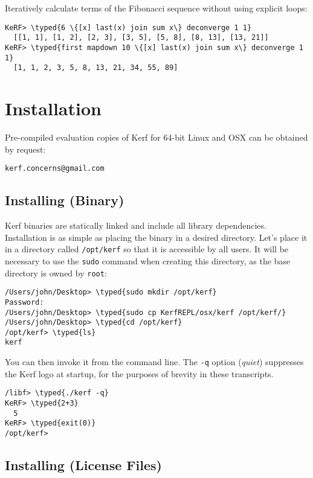 \documentclass{article}
\newcommand{\typed}[1]{\textcolor{TealBlue}{#1}}
\begin{document}
\vspace{0.5cm}

Iteratively calculate terms of the Fibonacci sequence without using explicit loops:
\begin{Verbatim}
KeRF> \typed{6 \{[x] last(x) join sum x\} deconverge 1 1}
  [[1, 1], [1, 2], [2, 3], [3, 5], [5, 8], [8, 13], [13, 21]]
KeRF> \typed{first mapdown 10 \{[x] last(x) join sum x\} deconverge 1 1}
  [1, 1, 2, 3, 5, 8, 13, 21, 34, 55, 89]
\end{Verbatim}

\pagebreak
\section {Installation}
Pre-compiled evaluation copies of Kerf for 64-bit Linux and OSX can be obtained by request:

\begin{center}
	\texttt{kerf.concerns@gmail.com}
\end{center}

\subsection{Installing (Binary)}
Kerf binaries are statically linked and include all library dependencies. Installation is as simple as placing the binary in a desired directory. Let's place it in a directory called \texttt{/opt/kerf} so that it is accessible by all users. It will be necessary to use the \texttt{sudo} command when creating this directory, as the base directory is owned by \texttt{root}:

\begin{Verbatim}
/Users/john/Desktop> \typed{sudo mkdir /opt/kerf}
Password:
/Users/john/Desktop> \typed{sudo cp KerfREPL/osx/kerf /opt/kerf/}
/Users/john/Desktop> \typed{cd /opt/kerf}
/opt/kerf> \typed{ls}
kerf
\end{Verbatim}

You can then invoke it from the command line. The \texttt{-q} option (\emph{quiet}) suppresses the Kerf logo at startup, for the purposes of brevity in these transcripts.

\begin{Verbatim}
/libf> \typed{./kerf -q}
KeRF> \typed{2+3}
  5
KeRF> \typed{exit(0)}
/opt/kerf> 
\end{Verbatim}

\subsection{Installing (License Files)}
\end{document}
